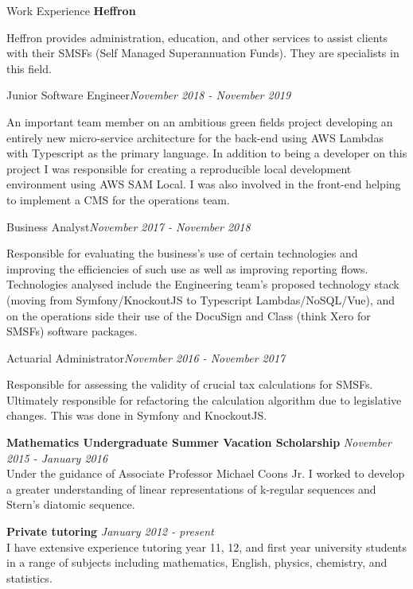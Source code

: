 \documentclass{resume} %
\begin{document}
\begin{rSection}{Work Experience}
{\bf Heffron}

Heffron provides administration, education, and other services to assist clients with their
SMSFs (Self Managed Superannuation Funds). They are specialists in this field.

\begin{adjustwidth}{2em}{}
    \begin{rSubsection}{Junior Software Engineer}{\em November 2018 - November 2019}{}{}
    \item An important team member on an ambitious green fields project developing an entirely new
    micro-service architecture for the back-end using AWS Lambdas with Typescript as the primary
    language. In addition to being a developer on this project I was responsible for creating a
    reproducible local development environment using AWS SAM Local. I was also involved in the
    front-end helping to implement a CMS for the operations team.
    \end{rSubsection}

    \begin{rSubsection}{Business Analyst}{\em November 2017 - November 2018}{}{}
    \item Responsible for evaluating the business's use of certain technologies and improving the
    efficiencies of such use as well as improving reporting flows. Technologies analysed include
    the Engineering team's proposed technology stack (moving from Symfony/KnockoutJS to Typescript
    Lambdas/NoSQL/Vue), and on the operations side their use of the DocuSign and Class
    (think Xero for SMSFs) software packages.
    \end{rSubsection}

    \begin{rSubsection}{Actuarial Administrator}{\em November 2016 - November 2017}{}{}
    \item Responsible for assessing the validity of crucial tax calculations for SMSFs.
    Ultimately responsible for refactoring the calculation algorithm due to legislative changes.
    This was done in Symfony and KnockoutJS.
    \end{rSubsection}
\end{adjustwidth}

{\bf Mathematics Undergraduate Summer Vacation Scholarship}
\hfill {\em November 2015 - January 2016} \\
Under the guidance of Associate Professor Michael Coons Jr. I worked to develop a greater
understanding of linear representations of k-regular sequences and Stern's diatomic sequence.

{\bf Private tutoring} \hfill {\em January 2012 - present} \\
I have extensive experience tutoring year 11, 12, and first year university students in a
range of subjects including mathematics, English, physics, chemistry, and statistics.
\end{rSection}
\end{document}
